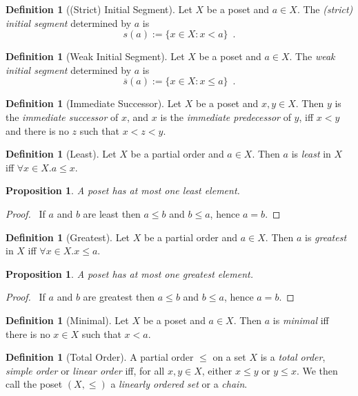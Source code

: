 \documentclass{report}
\let\qed\relax
\newtheorem{prop}[ax]{Proposition}
\theoremstyle{definition}
\newtheorem{df}[ax]{Definition}
\begin{document}
\begin{df}[(Strict) Initial Segment]
Let $X$ be a poset and $a \in X$. The \emph{(strict) initial segment} determined by $a$ is
\[ s(a) := \{ x \in X : x < a \} \enspace . \]
\end{df}

\begin{df}[Weak Initial Segment]
Let $X$ be a poset and $a \in X$. The \emph{weak initial segment} determined by $a$ is
\[ \overline{s}(a) := \{ x \in X : x \leq a \} \enspace . \]
\end{df}

\begin{df}[Immediate Successor]
Let $X$ be a poset and $x,y \in X$. Then $y$ is the \emph{immediate successor} of $x$, and $x$ is the \emph{immediate predecessor} of $y$, iff $x < y$ and there is no $z$ such that $x < z < y$.
\end{df}

\begin{df}[Least]
Let $X$ be a partial order and $a \in X$. Then $a$ is \emph{least} in $X$ iff $\forall x \in X. a \leq x$.
\end{df}

\begin{prop}
A poset has at most one least element.
\end{prop}

\begin{proof}
\pf\ If $a$ and $b$ are least then $a \leq b$ and $b \leq a$, hence $a = b$. \qed
\end{proof}

\begin{df}[Greatest]
Let $X$ be a partial order and $a \in X$. Then $a$ is \emph{greatest} in $X$ iff $\forall x \in X. x \leq a$.
\end{df}

\begin{prop}
A poset has at most one greatest element.
\end{prop}

\begin{proof}
\pf\ If $a$ and $b$ are greatest then $a \leq b$ and $b \leq a$, hence $a = b$. \qed
\end{proof}

\begin{df}[Minimal]
Let $X$ be a poset and $a \in X$. Then $a$ is \emph{minimal} iff there is no $x \in X$ such that $x < a$.
\end{df}

\begin{df}[Total Order]
A partial order $\leq$ on a set $X$ is a \emph{total order}, \emph{simple order} or \emph{linear order} iff, for all $x,y \in X$, either $x \leq y$ or $y \leq x$.
We then call the poset $(X, \leq)$ a \emph{linearly ordered set} or a \emph{chain}.
\end{df}
\end{document}
